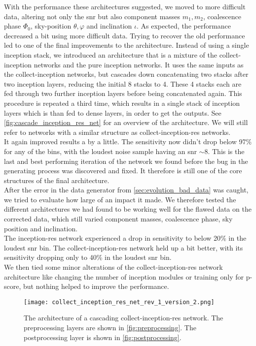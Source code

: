With the performance these architectures suggested, we moved to more difficult data, altering not only the \gls{snr} but also component masses $m_1, m_2$, coalescence phase $\Phi_0$, sky-position $\theta, \varphi$ and inclination $\iota$. As expected, the performance decreased a bit using more difficult data. Trying to recover the old performance led to one of the final improvements to the architecture. Instead of using a single inception stack, we introduced an architecture that is a mixture of the collect-inception networks and the pure inception networks. It uses the same inputs as the collect-inception networks, but cascades down concatenating two stacks after two inception layers, reducing the initial 8 stacks to 4. These 4 stacks each are fed through two further inception layers before being concatenated again. This procedure is repeated a third time, which results in a single stack of inception layers which is than fed to dense layers, in order to get the outputs. See \autoref{fig:cascade_inception_res_net} for an overview of the architecture. We will still refer to networks with a similar structure as collect-inception-res networks.\\
It again improved results a by a little. The sensitivity now didn't drop below 97\% for any of the bins, with the loudest noise sample having an \gls{snr} $\sim 8$. This is the last and best performing iteration of the network we found before the bug in the generating process was discovered and fixed. It therefore is still one of the core structures of the final architecture.\smallskip\\
After the error in the data generator from \autoref{sec:evolution_bad_data} was caught, we tried to evaluate how large of an impact it made. We therefore tested the different architectures we had found to be working well for the flawed data on the corrected data, which still varied component masses, coalescence phase, sky position and inclination.\\
The inception-res network experienced a drop in sensitivity to below 20\% in the loudest \gls{snr} bin. The collect-inception-res network held up a bit better, with its sensitivity dropping only to 40\% in the loudest \gls{snr} bin.\\
We then tied some minor alterations of the collect-inception-res network architecture like changing the number of inception modules or training only for p-score, but nothing helped to improve the performance.
\begin{figure}
\centering
\texttt{[image: collect\_inception\_res\_net\_rev\_1\_version\_2.png]}
\caption[Cascading architecture of a collect-inception-res network]{The architecture of a cascading collect-inception-res network. The preprocessing layers are shown in \autoref{fig:preprocessing}. The postprocessing layer is shown in \autoref{fig:postprocessing}.}\label{fig:cascade_inception_res_net}
\end{figure}

